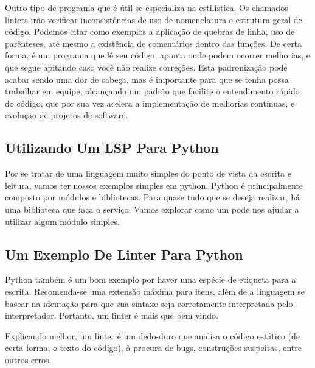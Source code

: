 Outro tipo de programa que é útil se especializa na estilística.
Os chamados linters irão verificar inconsistências de uso de nomenclatura e
estrutura geral de código. Podemos citar como exemplos a aplicação de quebras de linha, uso de parênteses,
até mesmo a existência de comentários dentro das funções.
De certa forma, é um programa que lê seu código, aponta onde podem ocorrer melhorias, e que segue apitando
caso você não realize correções.
Esta padronização pode acabar sendo uma dor de cabeça, mas é importante para que se tenha possa trabalhar em equipe,
alcançando um padrão que facilite o entendimento rápido do código, que por sua vez acelera a implementação de melhorias
contínuas, e evolução de projetos de software.

\subsection{Utilizando Um LSP Para Python}
Por se tratar de uma linguagem muito simples do ponto de vista da escrita e leitura,
vamos ter nossos exemplos simples em python.
Python é principalmente composto por módulos e bibliotecas.
Para quase tudo que se deseja realizar, há uma biblioteca que faça o serviço.
Vamos explorar como um  pode nos ajudar a utilizar algum módulo simples.


\subsection{Um Exemplo De Linter Para Python}
Python também é um bom exemplo por haver uma espécie de etiqueta para a escrita.
Recomenda-se uma extensão máxima para itens, além de a linguagem se basear na identação
para que sua sintaxe seja corretamente interpretada pelo interpretador.
Portanto, um linter é mais que bem vindo.


Explicando melhor, um linter é um dedo-duro que analisa o código estático (de certa forma, o texto do código),
à procura de bugs, construções suspeitas, entre outros erros.

\newpage
